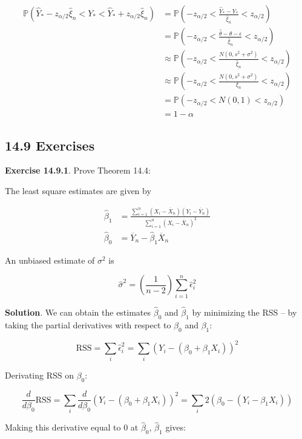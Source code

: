 \begin{align}
\mathbb{P}(\hat{Y}_* - z_{\alpha/2} \hat{\xi}_n < Y_* < \hat{Y}_* + z_{\alpha/2} \hat{\xi}_n) &=
\mathbb{P}\left(-z_{\alpha/2} < \frac{\hat{Y}_* - Y_*}{\hat{\xi}_n} < z_{\alpha/2} \right)\\
&= \mathbb{P}\left(-z_{\alpha/2} < \frac{\hat{\theta} - \theta - \epsilon}{\hat{\xi}_n} < z_{\alpha/2} \right) \\
&\approx \mathbb{P}\left(-z_{\alpha/2} < \frac{N(0, s^2 + \sigma^2)}{\hat{\xi}_n} < z_{\alpha/2} \right)  \\
&\approx \mathbb{P}\left(-z_{\alpha/2} < \frac{N(0, s^2 + \sigma^2)}{\xi_n} < z_{\alpha/2} \right)  \\
&= \mathbb{P}(-z_{\alpha/2} < N(0, 1) < z_{\alpha/2}) \\
&= 1 - \alpha
\end{align}

\subsection{14.9 Exercises}\label{exercises}

\textbf{Exercise 14.9.1}. Prove Theorem 14.4:

The least square estimates are given by

\begin{align}
\hat{\beta}_1 &= \frac{\sum_{i=1}^n (X_i - \overline{X}_n) (Y_i - \overline{Y}_n)}{\sum_{i=1}^n (X_i - \overline{X}_n)^2}\\
\hat{\beta}_0 &= \overline{Y}_n - \hat{\beta}_1 \overline{X}_n
\end{align}

An unbiased estimate of \(\sigma^2\) is

\[
\hat{\sigma}^2 = \left( \frac{1}{n - 2} \right) \sum_{i=1}^n \hat{\epsilon}_i^2
\]

\textbf{Solution}. We can obtain the estimates \(\hat{\beta}_0\) and
\(\hat{\beta}_1\) by minimizing the RSS -- by taking the partial
derivatives with respect to \(\beta_0\) and \(\beta_1\):

\[\text{RSS} = \sum_i \hat{\epsilon}_i^2 = \sum_i (Y_i - (\beta_0 + \beta_1 X_i))^2\]

Derivating RSS on \(\beta_0\):

\[\frac{d}{d \beta_0}\text{RSS} = \sum_i \frac{d}{d \beta_0} (Y_i - (\beta_0 + \beta_1 X_i))^2
= \sum_i 2 (\beta_0 - (Y_i - \beta_1 X_i))\]

Making this derivative equal to 0 at \(\hat{\beta}_0\),
\(\hat{\beta}_1\) gives:

